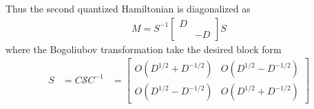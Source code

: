 Thus the second quantized Hamiltonian is diagonalized as
\begin{equation}\begin{aligned}
M=S^{-1}
\begin{bmatrix}
D \\
& -D
\end{bmatrix}
S
\end{aligned}\end{equation}
where the Bogoliubov transformation take the desired block form
\begin{equation}\begin{aligned}
S&=C\mathcal{S}C^{-1}
&=\begin{bmatrix}
O(D^{1/2}+D^{-1/2}) & O(D^{1/2}-D^{-1/2}) \\
O(D^{1/2}-D^{-1/2}) & O(D^{1/2}+D^{-1/2}) 
\end{bmatrix}
\end{aligned}\end{equation}


